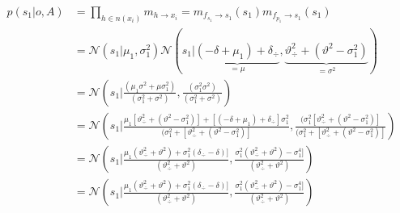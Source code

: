 \documentclass[11pt,twoside,spanish]{report} %
\begin{document}
\begin{equation}
	\begin{split}
		p(s_1|o,A) &= \prod_{h \in n(x_i)} m_{h \rightarrow x_i} = m_{f_{s_1} \rightarrow s_1}(s_1) m_{f_{p_1} \rightarrow s_1}(s_1) \\
		&=  \mathcal{N}(s_1| \mu_1, \sigma_1^2)   \mathcal{N}( s_1| \underbrace{(-\delta + \mu_1) + \delta_{\div}}_{=\mu} ,\underbrace{\vartheta_{\div}^2 + (\vartheta^2 - \sigma_1^2 )}_{=\sigma^2})  \\
		&=  \mathcal{N}\left(s_1|\frac{(\mu_1\sigma^2+\mu\sigma_1^2)}{(\sigma_1^2+\sigma^2)}, \frac{(\sigma_1^2\sigma^2)}{(\sigma_1^2+\sigma^2)}\right)\\
		&= \mathcal{N}\left(s_1\Big| \frac{\mu_1 [\vartheta_{\div}^2 + (\vartheta^2 - \sigma_1^2 )]+[(-\delta + \mu_1) + \delta_{\div}]\sigma_1^2}{(\sigma_1^2+[\vartheta_{\div}^2 + (\vartheta^2 - \sigma_1^2 )]},
		\frac{(\sigma_1^2[\vartheta_{\div}^2 + (\vartheta^2 - \sigma_1^2 )]}{(\sigma_1^2+[\vartheta_{\div}^2 + (\vartheta^2 - \sigma_1^2 )]}\right)\\
		&= \mathcal{N}\left(s_1\Big| \frac{\mu_1 (\vartheta_{\div}^2 + \vartheta^2)+\sigma_1^2(\delta_{\div}-\delta)]}{(\vartheta_{\div}^2 + \vartheta^2 )},
		\frac{\sigma_1^2(\vartheta_{\div}^2 + \vartheta^2) - \sigma_1^4 ]}{(\vartheta_{\div}^2 + \vartheta^2)}\right)\\
		&= \mathcal{N}\left(s_1\Big| \frac{\mu_1 (\vartheta_{\div}^2 + \vartheta^2)+\sigma_1^2(\delta_{\div}-\delta)]}{(\vartheta_{\div}^2 + \vartheta^2 )},
		\frac{\sigma_1^2(\vartheta_{\div}^2 + \vartheta^2) - \sigma_1^4 ]}{(\vartheta_{\div}^2 + \vartheta^2)}\right)
	\end{split}
\end{equation}
\end{document}
